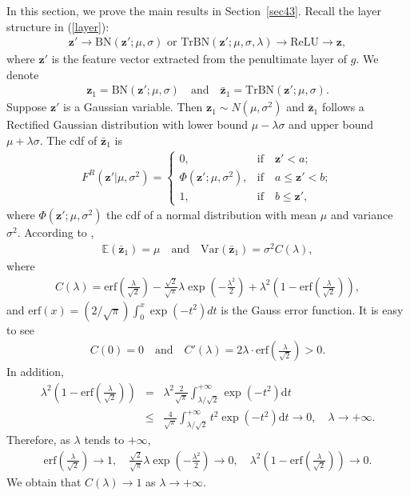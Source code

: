 \documentclass{article}
\newcommand{\benr}{\begin{eqnarray}}
\newcommand{\eenr}{\end{eqnarray}}
\def\rvz{{\mathbf{z}}}
\newcommand{\E}{\mathbb{E}}
\newcommand{\rarrow}{\rightarrow}
\begin{document}
In this section, we prove the main results in Section~\ref{sec43}.
Recall the layer structure in (\ref{layer}):
\benr
\rvz' \rarrow \text{BN}(\rvz'; \mu, \sigma)\text{ or } \text{TrBN}(\rvz'; \mu, \sigma,\lambda)\rarrow \text{ReLU}  \rarrow \rvz,
\eenr
where $\rvz'$ is the feature vector extracted from the penultimate layer of $g.$ We denote 
\benr
\rvz_1 = \text{BN}(\rvz'; \mu, \sigma) \quad \text{and} \quad \bar \rvz_1 = \text{TrBN}(\rvz'; \mu, \sigma). 
\eenr
Suppose $\rvz'$ is a Gaussian variable. Then $\rvz_1 \sim N(\mu, \sigma^2)$ and $\bar \rvz_1$ follows a Rectified Gaussian distribution with lower bound $\mu-\lambda\sigma$ and upper bound $\mu+\lambda\sigma.$ 
The cdf of $\bar \rvz_1$ is
\benr
F^R(\rvz'| \mu, \sigma^2) =  \begin{cases}
0, & \text{if} \quad \rvz' <a ; \\
\Phi(\rvz'; \mu, \sigma^2),  & \text{if}  \quad a \leq \rvz' < b; \\
1, & \text{if}\quad b \leq \rvz',
\end{cases}
\eenr
where $\Phi(\rvz'; \mu, \sigma^2)$ the cdf of a normal distribution with mean $\mu$ and variance $\sigma^2.$
According to \cite{PALMER201751}, 
\benr
\E(\bar \rvz_1) = \mu \quad \text{and} \quad \text{Var}(\bar \rvz_1) = \sigma^2 C(\lambda),
\eenr
where
\benr
C(\lambda) =  \text{erf}(\frac{\lambda}{\sqrt 2}) - \frac{\sqrt 2}{\sqrt \pi}\lambda \exp(-\frac{\lambda^2}{2}) + \lambda^2(1-\text{erf}(\frac{\lambda}{\sqrt 2})),
\eenr
and $\text{erf}(x) = (2/\sqrt \pi) \int_0^x \exp(-t^2) dt$ is the Gauss error function.
It is easy to see
\benr
C(0)=0 \quad \text{and} \quad C'(\lambda) = 2 \lambda \cdot \text{erf}(\frac{\lambda}{\sqrt  2}) > 0.
\eenr
In addition,
\benr
\lambda^2(1-\text{erf}(\frac{\lambda}{\sqrt 2})) &=&  \lambda^2 \frac{2}{\sqrt \pi} \int_{\lambda/\sqrt 2}^{+\infty} \exp(-t^2) \mathrm{d} t \\
&\leq& \frac{4}{\sqrt \pi} \int_{\lambda/\sqrt 2}^{+\infty} t^2 \exp(-t^2) \mathrm{d} t \to 0, \quad \lambda \to +\infty. \nonumber
\eenr
Therefore, as $\lambda$ tends to $+\infty$,
\benr
\text{erf}(\frac{\lambda}{\sqrt 2}) \to 1, \quad \frac{\sqrt 2}{\sqrt \pi}\lambda \exp(-\frac{\lambda^2}{2}) \to 0, \quad \lambda^2(1-\text{erf}(\frac{\lambda}{\sqrt 2}))\to 0.
\eenr
We obtain that $C(\lambda) \to 1$ as $\lambda\to +\infty.$
\end{document}
